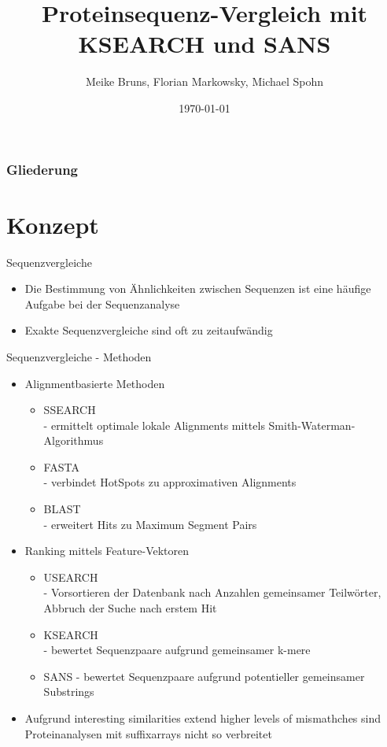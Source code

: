 \documentclass[xcolor=dvipsnames, aspectratio=1610]{beamer}
\author{Meike Bruns, Florian Markowsky, Michael Spohn}
\title{Proteinsequenz-Vergleich mit KSEARCH und SANS}
\date{\today}
\begin{document}

\maketitle

\begin{frame}
	\frametitle{Gliederung}
	\tableofcontents
\end{frame}

\section{Konzept}

\begin{frame}{Sequenzvergleiche}
  \begin{itemize}
    \item Die Bestimmung von Ähnlichkeiten zwischen Sequenzen ist eine häufige Aufgabe bei der Sequenzanalyse 
    \item Exakte Sequenzvergleiche sind oft zu zeitaufwändig 
  \end{itemize}
\end{frame}

\begin{frame}{Sequenzvergleiche - Methoden}
  \begin{itemize}
    \item Alignmentbasierte Methoden
      \begin{itemize}
        \item SSEARCH\\
              - ermittelt optimale lokale Alignments mittels Smith-Waterman-Algorithmus
        \item FASTA\\
              - verbindet HotSpots zu approximativen Alignments
        \item BLAST\\
              - erweitert Hits zu Maximum Segment Pairs
      \end{itemize}
    \item Ranking mittels Feature-Vektoren
      \begin{itemize}
        \item USEARCH\\
              - Vorsortieren der Datenbank nach Anzahlen gemeinsamer Teilwörter, Abbruch der Suche nach erstem Hit
        \item KSEARCH\\
              - bewertet Sequenzpaare aufgrund gemeinsamer k-mere
        \item SANS
              - bewertet Sequenzpaare aufgrund potentieller gemeinsamer Substrings
      \end{itemize}
      \item Aufgrund interesting similarities extend higher levels of mismathches sind Proteinanalysen mit suffixarrays nicht so verbreitet
  \end{itemize}
\end{frame}
\end{document}

